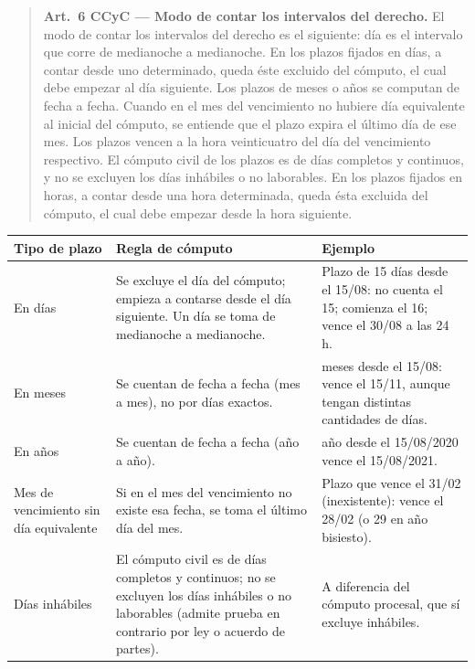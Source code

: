 \documentclass[12pt,oneside]{book}
\begin{document}
\begin{quote}
\textbf{Art.~6 CCyC --- Modo de contar los intervalos del derecho.} El modo de contar los intervalos del derecho es el siguiente: día es el intervalo que corre de medianoche a medianoche. En los plazos fijados en días, a contar desde uno determinado, queda éste excluido del cómputo, el cual debe empezar al día siguiente. Los plazos de meses o años se computan de fecha a fecha. Cuando en el mes del vencimiento no hubiere día equivalente al inicial del cómputo, se entiende que el plazo expira el último día de ese mes. Los plazos vencen a la hora veinticuatro del día del vencimiento respectivo. El cómputo civil de los plazos es de días completos y continuos, y no se excluyen los días inhábiles o no laborables. En los plazos fijados en horas, a contar desde una hora determinada, queda ésta excluida del cómputo, el cual debe empezar desde la hora siguiente.
\end{quote}

\begin{table}[H]
\centering
\begin{tabularx}{\textwidth}{>{\raggedright\arraybackslash}p{} >{\raggedright\arraybackslash}X >{\raggedright\arraybackslash}p{}}
\toprule
\textbf{Tipo de plazo} & \textbf{Regla de cómputo} & \textbf{Ejemplo} \\
\midrule
En días &
Se excluye el día del cómputo; empieza a contarse desde el día siguiente. Un día se toma de medianoche a medianoche. &
Plazo de 15 días desde el 15/08: no cuenta el 15; comienza el 16; vence el 30/08 a las 24 h. \\
\addlinespace
En meses &
Se cuentan de fecha a fecha (mes a mes), no por días exactos. &
3 meses desde el 15/08: vence el 15/11, aunque tengan distintas cantidades de días. \\
\addlinespace
En años &
Se cuentan de fecha a fecha (año a año). &
1 año desde el 15/08/2020 vence el 15/08/2021. \\
\addlinespace
Mes de vencimiento sin día equivalente &
Si en el mes del vencimiento no existe esa fecha, se toma el último día del mes. &
Plazo que vence el 31/02 (inexistente): vence el 28/02 (o 29 en año bisiesto). \\
\addlinespace
Días inhábiles &
El cómputo civil es de días completos y continuos; no se excluyen los días inhábiles o no laborables (admite prueba en contrario por ley o acuerdo de partes). &
A diferencia del cómputo procesal, que sí excluye inhábiles. \\
\bottomrule
\end{tabularx}
\end{table}
\end{document}
